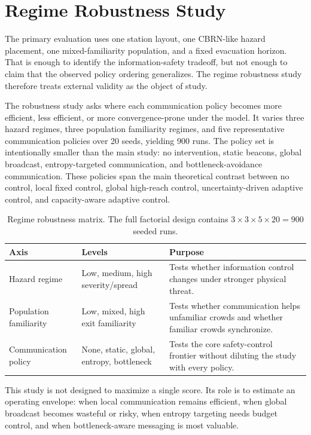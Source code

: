 \section{Regime Robustness Study}
\label{sec:robustness-plan}

The primary evaluation uses one station layout, one CBRN-like hazard placement,
one mixed-familiarity population, and a fixed evacuation horizon. That is enough
to identify the information-safety tradeoff, but not enough to claim that the
observed policy ordering generalizes. The regime robustness study therefore
treats external validity as the object of study.

The robustness study asks where each communication policy becomes more
efficient, less efficient, or more convergence-prone under the model. It
varies three hazard regimes, three population familiarity regimes, and five
representative communication policies over 20 seeds, yielding 900 runs. The
policy set is intentionally smaller than the main
study: no intervention, static beacons, global broadcast, entropy-targeted
communication, and bottleneck-avoidance communication. These policies span the
main theoretical contrast between no control, local fixed control, global
high-reach control, uncertainty-driven adaptive control, and capacity-aware
adaptive control.

\begin{table}[!t]
\centering
\caption{Regime robustness matrix. The full factorial design contains
$3 \times 3 \times 5 \times 20 = 900$ seeded runs.}
\label{tab:robustness-matrix}
\begin{tabular}{p{}p{}p{}}
\toprule
Axis & Levels & Purpose \\
\midrule
Hazard regime & Low, medium, high severity/spread & Tests whether information
control changes under stronger physical threat. \\
Population familiarity & Low, mixed, high exit familiarity & Tests whether
communication helps unfamiliar crowds and whether familiar crowds synchronize. \\
Communication policy & None, static, global, entropy, bottleneck & Tests the
core safety-control frontier without diluting the study with every policy. \\
\bottomrule
\end{tabular}
\end{table}

This study is not designed to maximize a single score. Its role is to estimate
an operating envelope: when local communication remains efficient, when global
broadcast becomes wasteful or risky, when entropy targeting needs budget
control, and when bottleneck-aware messaging is most valuable.

